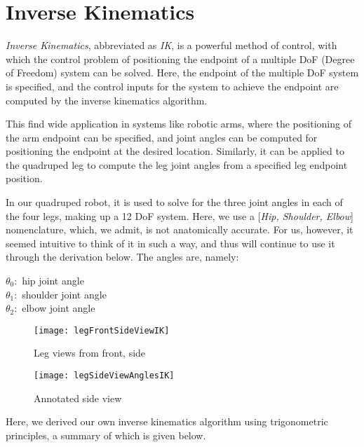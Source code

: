 \section{Inverse Kinematics}

\emph{Inverse Kinematics}, abbreviated as \emph{IK}, is a powerful method of control, with which the control problem of positioning the endpoint of a multiple DoF (Degree of Freedom) system can be solved. Here, the endpoint of the multiple DoF system is specified, and the control inputs for the system to achieve the endpoint are computed by the inverse kinematics algorithm.

This find wide application in systems like robotic arms, where the positioning of the arm endpoint can be specified, and joint angles can be computed for positioning the endpoint at the desired location. Similarly, it can be applied to the quadruped leg to compute the leg joint angles from a specified leg endpoint position.

In our quadruped robot, it is used to solve for the three joint angles in each of the four legs, making up a 12 DoF system. Here, we use a [\emph{Hip, Shoulder, Elbow}] nomenclature, which, we admit, is not anatomically accurate. For us, however, it seemed intuitive to think of it in such a way, and thus will continue to use it through the derivation below. The angles are, namely:

\begin{center}
    \(\theta_0 : \) hip joint angle\\
    \(\theta_1 : \) shoulder joint angle\\
    \(\theta_2 : \) elbow joint angle\\
\end{center}

\begin{figure}
    \begin{multicols}{2}
        \texttt{[image: legFrontSideViewIK]}
        \caption{\small Leg views from front, side}
        \label{fig:legViewsIK}
        
        \texttt{[image: legSideViewAnglesIK]}
        \caption{\small Annotated side view}
        \label{fig:sideViewAnnIK}
    \end{multicols}     
\end{figure}

Here, we derived our own inverse kinematics algorithm using trigonometric principles, a summary of which is given below.

